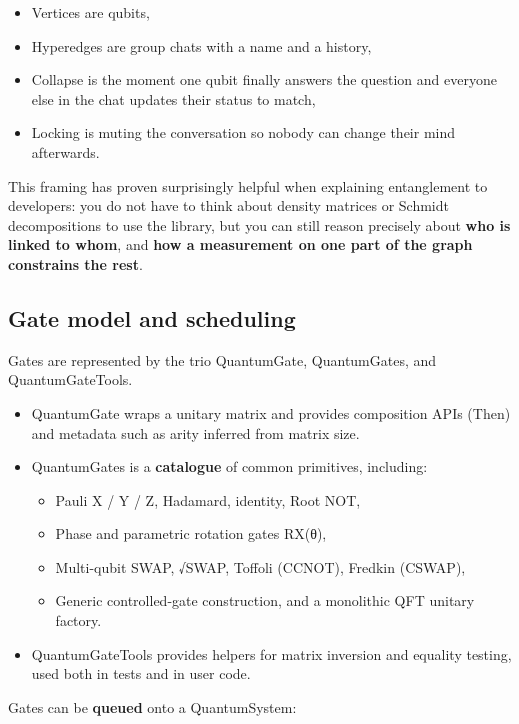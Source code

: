 \documentclass[a4paper,11pt]{article}
\begin{document}
\begin{itemize}
\item
  Vertices are qubits,
\item
  Hyperedges are group chats with a name and a history,
\item
  Collapse is the moment one qubit finally answers the question and everyone else in the chat updates their status to match,
\item
  Locking is muting the conversation so nobody can change their mind afterwards.
\end{itemize}

This framing has proven surprisingly helpful when explaining entanglement to developers: you do not have to think about density matrices or Schmidt decompositions to use the library, but you can still reason precisely about \textbf{who is linked to whom}, and \textbf{how a measurement on one part of the graph constrains the rest}.

\subsection{Gate model and scheduling}

Gates are represented by the trio QuantumGate, QuantumGates, and QuantumGateTools.

\begin{itemize}
\item
  QuantumGate wraps a unitary matrix and provides composition APIs (Then) and metadata such as arity inferred from matrix size.
\item
  QuantumGates is a \textbf{catalogue} of common primitives, including:

  \begin{itemize}
  \item
    Pauli X / Y / Z, Hadamard, identity, Root NOT,
  \item
    Phase and parametric rotation gates RX(θ),
  \item
    Multi-qubit SWAP, √SWAP, Toffoli (CCNOT), Fredkin (CSWAP),
  \item
    Generic controlled-gate construction, and a monolithic QFT unitary factory.
  \end{itemize}
\item
  QuantumGateTools provides helpers for matrix inversion and equality testing, used both in tests and in user code.
\end{itemize}

Gates can be \textbf{queued} onto a QuantumSystem:
\end{document}
